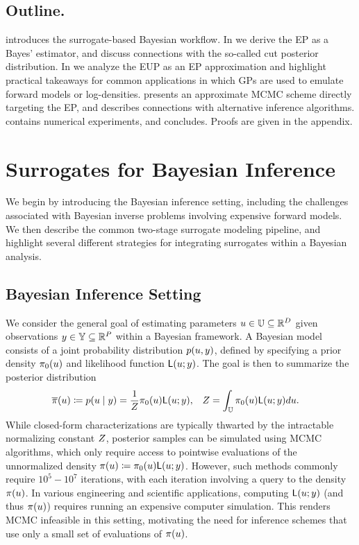 \documentclass[12pt]{article}
\begin{document}
\subsection{Outline.}
 introduces the surrogate-based Bayesian workflow.
In  we derive the EP as a Bayes' estimator, and discuss connections 
with the so-called cut posterior distribution. In 
we analyze the EUP as an EP approximation and highlight practical 
takeaways for common applications in which GPs are used to emulate 
forward models or log-densities.
 presents an approximate MCMC scheme directly 
targeting the EP, and describes connections with alternative inference algorithms. 
 contains numerical experiments, and 
 concludes. Proofs are given in the appendix.

\section{Surrogates for Bayesian Inference} \label{sec:surrogates-intro}
We begin by introducing the Bayesian inference setting, including the challenges
associated with Bayesian inverse problems involving expensive forward models. 
We then describe the common two-stage surrogate modeling pipeline, and highlight 
several different strategies for integrating surrogates within a Bayesian analysis.

\subsection{Bayesian Inference Setting}
We consider the general goal of estimating parameters $u \in \mathbb{U} \subseteq \mathbb{R}^{D}$ given 
observations $y \in \mathbb{Y} \subseteq \mathbb{R}^{P}$ within a Bayesian framework.
A Bayesian model consists of a joint probability distribution $p(u, y)$, defined by 
specifying a prior density $\pi_0(u)$ and likelihood function $\mathsf{L}(u; y)$.
The goal is then to summarize the posterior distribution 
\begin{align}
&\overline{\pi}(u) \coloneqq p(u \mid y) = \frac{1}{Z} \pi_0(u) \mathsf{L}(u; y), 
&&Z = \int_{\mathbb{U}} \pi_0(u) \mathsf{L}(u; y) du. \label{eq:post_dens_generic}
\end{align}
While closed-form characterizations are typically thwarted by the intractable normalizing constant
$Z$, posterior samples can be simulated using MCMC algorithms, which only require 
access to pointwise evaluations of the unnormalized density 
$\pi(u) \coloneqq \pi_0(u) \mathsf{L}(u; y)$.
However, such methods commonly require $10^5 - 10^7$ iterations, with each iteration 
involving a query to the density $\pi(u)$.
In various engineering and scientific applications, computing $\mathsf{L}(u; y)$ (and thus
$\pi(u)$) requires running an expensive computer simulation. 
This renders MCMC infeasible in this setting, motivating the need for inference schemes
that use only a small set of evaluations of $\pi(u)$.
 
\end{document}
